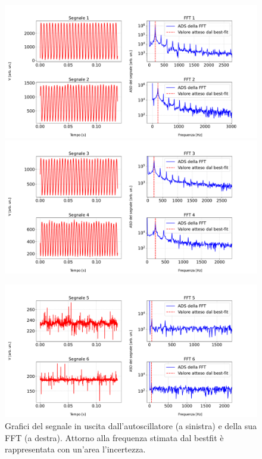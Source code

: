 \documentclass{article}
\begin{document}
        \begin{figure}[H]
            \centering
            \includegraphics[scale=0.425]{FFT11/first_graph.pdf}
            \includegraphics[scale=0.425]{FFT11/second_graph.pdf}
        \end{figure}
            
        \begin{figure}[H]        
            \includegraphics[scale=0.425]{FFT11/third_graph.pdf}
            \caption{Grafici del segnale in uscita dall'autoscillatore (a sinistra) e 
            della sua FFT (a destra). Attorno alla frequenza stimata dal bestfit è 
            rappresentata con un'area l'incertezza.}
            \label{fig:sign_rfft_autoscill}
        \end{figure}
\end{document}
